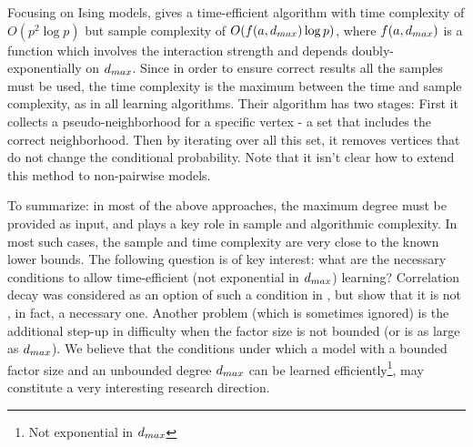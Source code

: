 Focusing on Ising models,  \cite{bresler2015efficiently} gives a time-efficient algorithm with time complexity of $O(p^2\log p)$ but sample complexity of $O( f(a,d_{max}) \log p)$, where $f(a,d_{max})$ is a function which involves the interaction strength and depends doubly-exponentially on $d_{max}$.
Since in order to ensure correct results all the samples must be used, the time complexity is the maximum between the time and sample complexity, as in all learning algorithms. 
Their algorithm has two stages: First it collects a pseudo-neighborhood for a specific vertex - a set that includes the correct neighborhood.
Then by iterating over all this set, it removes vertices that do not change the conditional probability.
Note that it isn't clear how to extend this method to non-pairwise models.

To summarize: in most of the above approaches, the maximum degree must be provided as input, and plays a key role in sample and algorithmic complexity.
In most such cases, the sample and time complexity are very close to the known lower bounds.
The following question is of key interest: what are the necessary conditions to allow time-efficient (not exponential in $d_{max}$) learning?
Correlation decay was considered as an option of such a condition in \cite{montanari2009graphical}, but \cite{bresler2014structure} show that it is not , in fact, a necessary one.
Another problem (which is sometimes ignored) is the additional step-up in difficulty when the factor size is not bounded (or is as large as $d_{max}$). 
We believe that the conditions under which a model with a bounded factor size and an unbounded degree $d_{max}$ can be learned efficiently\footnote{Not exponential in $d_{max}$}, may constitute a very interesting research direction.
